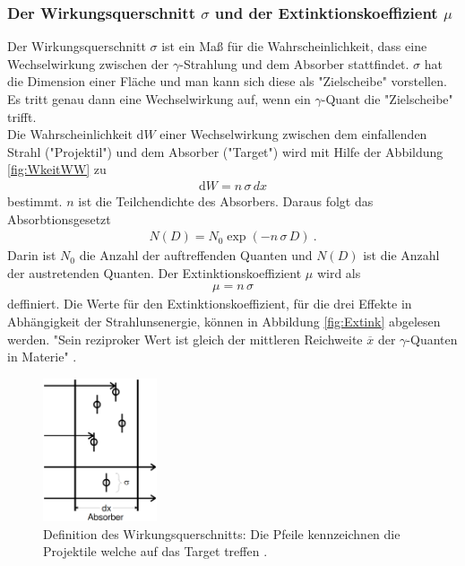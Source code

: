 \subsubsection{Der Wirkungsquerschnitt \texorpdfstring{$\sigma$}{} und der Extinktionskoeffizient \texorpdfstring{$\mu$}{}}
Der Wirkungsquerschnitt $\sigma$ ist ein Maß für die Wahrscheinlichkeit, dass eine Wechselwirkung zwischen der $\gamma$-Strahlung und dem Absorber stattfindet. $\sigma$ hat die Dimension einer Fläche und man kann sich diese als "Zielscheibe" vorstellen. Es tritt genau dann eine Wechselwirkung auf, wenn ein $\gamma$-Quant die "Zielscheibe" trifft. \\
Die Wahrscheinlichkeit d$W$ einer Wechselwirkung zwischen dem einfallenden Strahl ("Projektil") und dem Absorber ("Target") wird mit Hilfe der Abbildung \eqref{fig:WkeitWW} zu
\begin{align}
	\text{d}W = n\,\sigma\,dx
\end{align}
bestimmt. $n$ ist die Teilchendichte des Absorbers.
Daraus folgt das Absorbtionsgesetzt
\begin{align}
	N(D) = N_0 \exp(-n\,\sigma\,D) \ .
	\label{eqn:Absorbtion}
\end{align}
Darin ist $N_0$ die Anzahl der auftreffenden Quanten und $N(D)$ ist die Anzahl der austretenden Quanten. Der Extinktionskoeffizient $\mu$ wird als
\begin{align}
	\mu = n\,\sigma
\end{align}
deffiniert. Die Werte für den Extinktionskoeffizient, für die drei Effekte in Abhängigkeit der Strahlunsenergie, können in Abbildung \eqref{fig:Extink} abgelesen werden. "Sein reziproker Wert ist gleich der mittleren Reichweite $\overline{x}$ der $\gamma$-Quanten in Materie" \cite[2]{V18}.

\begin{figure}
	\centering
	\includegraphics[width=0.3\textwidth]{Bilder/WkeitWW.png}
	\caption{Definition des Wirkungsquerschnitts: Die Pfeile kennzeichnen die Projektile welche auf das Target treffen \cite{V18}.}
	\label{fig:WkeitWW}
\end{figure}

